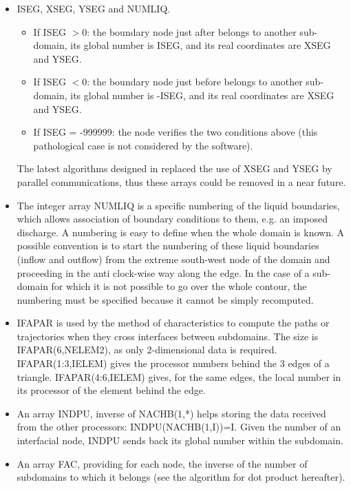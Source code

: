 \begin{itemize}
  \item ISEG, XSEG, YSEG and NUMLIQ.
    \begin{itemize}
      \item If ISEG $>$0: the boundary node just after belongs to another
        sub-domain, its global number is ISEG, and its real coordinates are
        XSEG and YSEG.
      \item If ISEG $<$0: the boundary node just before belongs to another
        sub-domain, its global number is -ISEG, and its real coordinates are
        XSEG and YSEG.
      \item If ISEG = -999999: the node verifies the two conditions above (this
        pathological case is not considered by the software).
    \end{itemize}
    The latest algorithms designed in \tel replaced the use of XSEG and YSEG
    by parallel communications, thus these arrays could be removed in a near
    future.
\item The integer array NUMLIQ is a specific numbering of the liquid
  boundaries, which allows association of boundary conditions to them, e.g. an
  imposed discharge. A numbering is easy to define when the whole domain is
  known. A possible convention is to start the numbering of these liquid
  boundaries (inflow and outflow) from the extreme south-west node of the
  domain and proceeding in the anti clock-wise way along the edge. In the case
  of a sub-domain for which it is not possible to go over the whole contour,
  the numbering must be specified because it cannot be simply recomputed.

\item IFAPAR is used by the method of characteristics to compute the
  paths or trajectories when they cross interfaces between subdomains. The
  size is IFAPAR(6,NELEM2), as only 2-dimensional data is required.
  IFAPAR(1:3,IELEM) gives the processor numbers behind the 3 edges of a
  triangle. IFAPAR(4:6,IELEM) gives, for the same edges, the local number in
  its processor of the element behind the edge.

\item An array INDPU, inverse of NACHB(1,*) helps storing the data
  received from the other processors: INDPU(NACHB(1,I))=I. Given the number of
  an interfacial node, INDPU sends back its global number within the
  subdomain.

\item An array FAC, providing for each node, the inverse of the number
  of subdomains to which it belongs (see the algorithm for dot product
  hereafter).
\end{itemize}

